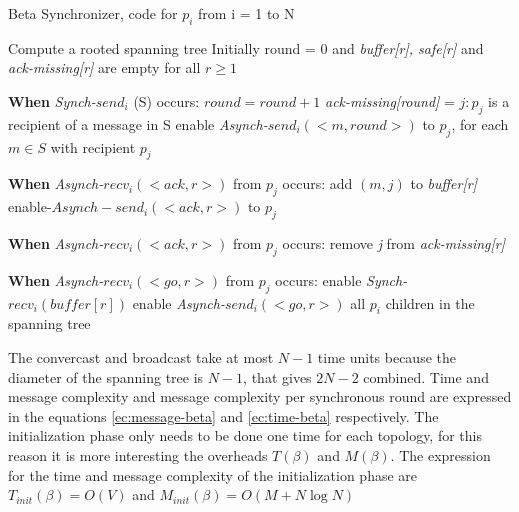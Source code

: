 \begin{algorithm}
 \caption{Beta Synchronizer, code for $p_i$ from i = 1 to N}
 \label{algorithm:beta} 

\SetAlgoNoLine

Compute a rooted spanning tree
Initially round = 0 and \newline
\textit{buffer[r], safe[r]} and \textit{ack-missing[r]} are empty for all $r \geq 1$ \newline

\textbf{When} \textit{Synch-}$send_i$ (S) occurs:\newline
$round = round + 1$ \newline
\textit{ack-missing[round]} = {$j:p_j$ is a recipient of a message in S} \newline
enable \textit{Asynch-}$send_i(<m,round>)$  to $p_j$, for each $m \in S$ with recipient $p_j$ \newline

\textbf{When} \textit{Asynch-}$recv_i(<ack,r>)$ from $p_j$ occurs: \newline
add $(m,j)$ to \textit{buffer[r]} \newline
enable-$Asynch-send_i(<ack,r>)$ to $p_j$ \newline

\textbf{When} \textit{Asynch-}$recv_i(<ack,r>)$ from $p_j$ occurs: \newline
remove \textit{j} from \textit{ack-missing[r]} \newline
{}

\textbf{When} \textit{Asynch-}$recv_i(<go,r>)$ from $p_j$ occurs: \newline
  enable \textit{Synch-}$recv_i(buffer[r])$ \newline
  enable \textit{Asynch-}$send_i(<go,r>)$ all $p_i$ children in the spanning tree \newline

\end{algorithm}

The convercast and broadcast take at most $N - 1$ time units because the diameter of the spanning tree is $N - 1$, that gives $2N - 2$ combined. Time and message complexity and message complexity per synchronous round are expressed in the equations \ref{ec:message-beta} and \ref{ec:time-beta} respectively. The initialization phase only needs to be done one time for each topology, for this reason it is more interesting the overheads $T(\beta)$ and $M(\beta)$. The expression for the time and message complexity of the initialization phase are $T_{init}(\beta) = O(V)$ and $M_{init}(\beta) = O(M + N \log N)$ 

